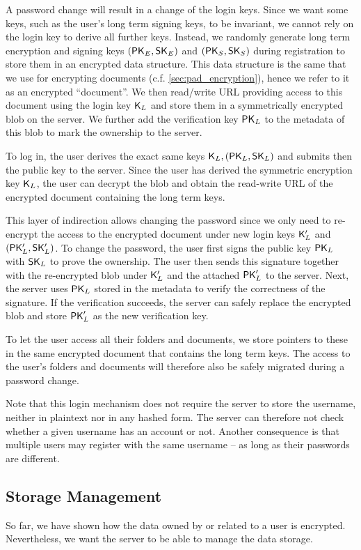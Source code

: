 A password change will result in a change of the login keys.
Since we want some keys, such as the user's long term signing keys, to be invariant, we cannot rely on the login key to derive all further keys.
Instead, we randomly generate long term encryption and signing keys $\myKeyPair{_E}$ and $\myKeyPair{_S}$ during registration to store them in an encrypted data structure.
This data structure is the same that we use for encrypting documents (c.f. \cref{sec:pad_encryption}), hence we refer to it as an encrypted \enquote{document}.
We then read/write URL providing access to this document using the login key $\mySymKey_L$ and store them in a symmetrically encrypted blob on the server.
We further add the verification key $\myPK_L$ to the metadata of this blob to mark the ownership to the server.

To log in, the user derives the exact same keys $\mySymKey_L, \myKeyPair{_L}$ and submits then the public key to the server.
Since the user has derived the symmetric encryption key $\mySymKey_L$, the user can decrypt the blob and obtain the read-write URL of the encrypted document containing the long term keys.

This layer of indirection allows changing the password since we only need to re-encrypt the access to the encrypted document under new login keys $\mySymKey_L'$ and $\myKeyPair{_L'}$.
To change the password, the user first signs the public key $\myPK_L$ with $\mySK_L$ to prove the ownership.
The user then sends this signature together with the re-encrypted blob under $\mySymKey_L'$ and the attached $\myPK_L'$ to the server.
Next, the server uses $\myPK_L$ stored in the metadata to verify the correctness of the signature.
If the verification succeeds, the server can safely replace the encrypted blob and store $\myPK_L'$ as the new verification key.

To let the user access all their folders and documents, we store pointers to these in the same encrypted document that contains the long term keys.
The access to the user's folders and documents will therefore also be safely migrated during a password change.

Note that this login mechanism does not require the server to store the username, neither in plaintext nor in any hashed form.
The server can therefore not check whether a given username has an account or not.
Another consequence is that multiple users may register with the same username -- as long as their passwords are different.

\subsection{Storage Management}
\label{sec:storage_mangamenet}
So far, we have shown how the data owned by or related to a user is encrypted.
Nevertheless, we want the server to be able to manage the data storage.

